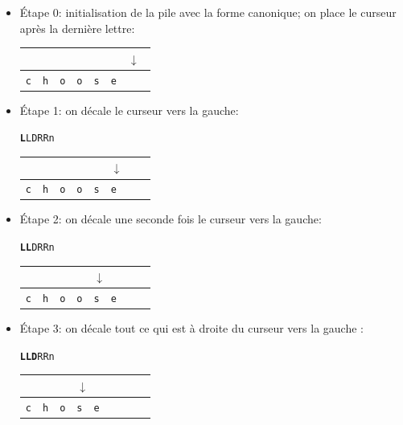 \begin{itemize}
  \item Étape 0: initialisation de la pile avec la forme canonique; on place le curseur après la
  	  dernière lettre:

\begin{center}
\begin{tabular}{|l|l|l|l|l|l|l|l}
\multicolumn{6}{l}{} & \multicolumn{2}{l}{$\downarrow$} \\
\hline
\verb+c+ & \verb+h+ & \verb+o+ & \verb+o+ & \verb+s+ & \verb+e+ & \verb+ + & \\
\hline
\end{tabular}
\end{center}

\bigskip
\item Étape 1: on décale le curseur vers la gauche:

\begin{center}
\texttt{\textbf{L}LDRRn}

\begin{tabular}{|l|l|l|l|l|l|l|l}
\multicolumn{5}{l}{} & \multicolumn{3}{l}{$\downarrow$} \\
\hline
\verb+c+ & \verb+h+ & \verb+o+ & \verb+o+ & \verb+s+ & \verb+e+ & \verb+ + & \\
\hline
\end{tabular}
\end{center}

\bigskip
\item Étape 2: on décale une seconde fois le curseur vers la gauche:

\begin{center}
\texttt{\textbf{LL}DRRn}

\begin{tabular}{|l|l|l|l|l|l|l|l}
\multicolumn{4}{l}{} & \multicolumn{4}{l}{$\downarrow$} \\
\hline
\verb+c+ & \verb+h+ & \verb+o+ & \verb+o+ & \verb+s+ & \verb+e+ & \verb+ + & \\
\hline
\end{tabular}
\end{center}

\bigskip \item Étape 3: on décale tout ce qui est à droite du curseur vers la gauche :

\begin{center}
\texttt{\textbf{LLD}RRn}

\begin{tabular}{|l|l|l|l|l|l|l|l}
\multicolumn{3}{l}{} & \multicolumn{5}{l}{$\downarrow$} \\
\hline
\verb+c+ & \verb+h+ & \verb+o+ & \verb+s+ & \verb+e+ & \verb+ + & \verb+ + & \\
\hline
\end{tabular}
\end{center}


\end{itemize}
